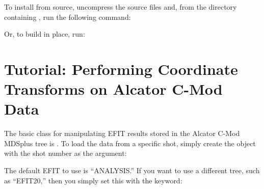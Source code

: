 \documentclass[letterpaper,10pt,english]{sphinxmanual}
\begin{document}
\begin{sphinxVerbatim}[commandchars=\\\{\}]
  
\end{sphinxVerbatim}

To install from source, uncompress the source files and, from the directory containing , run the following command:

\begin{sphinxVerbatim}[commandchars=\\\{\}]
  
\end{sphinxVerbatim}

Or, to build in place, run:

\begin{sphinxVerbatim}[commandchars=\\\{\}]
   
\end{sphinxVerbatim}


\chapter{Tutorial: Performing Coordinate Transforms on Alcator C-Mod Data}
\label{\detokenize{index:tutorial-performing-coordinate-transforms-on-alcator-c-mod-data}}
The basic class for manipulating EFIT results stored in the Alcator C-Mod MDSplus tree is {\hyperref[\detokenize{eqtools:eqtools.CModEFIT.CModEFITTree}]{}}. To load the data from a specific shot, simply create the {\hyperref[\detokenize{eqtools:eqtools.CModEFIT.CModEFITTree}]{}} object with the shot number as the argument:

\begin{sphinxVerbatim}[commandchars=\\\{\}]
  
\end{sphinxVerbatim}

The default EFIT to use is “ANALYSIS.” If you want to use a different tree, such as “EFIT20,” then you simply set this with the  keyword:

\begin{sphinxVerbatim}[commandchars=\\\{\}]
   
\end{sphinxVerbatim}
\end{document}
